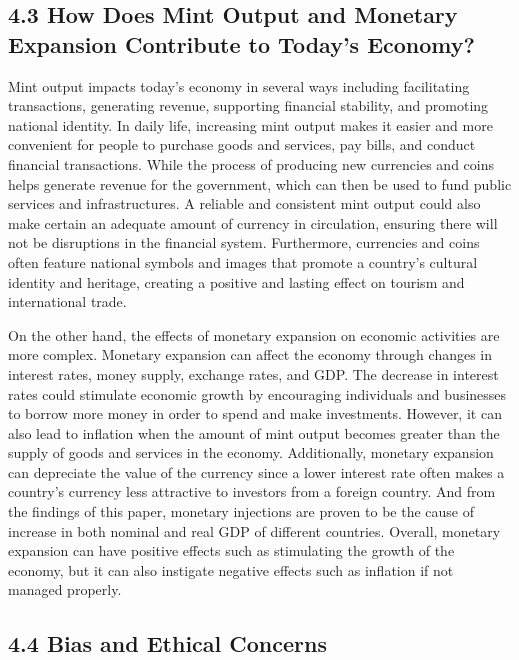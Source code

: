 \documentclass[
  letterpaper,
  DIV=11,
  numbers=noendperiod]{scrartcl}
\begin{document}
\hypertarget{how-does-mint-output-and-monetary-expansion-contribute-to-todays-economy}{%
\subsection{4.3 How Does Mint Output and Monetary Expansion Contribute
to Today's
Economy?}\label{how-does-mint-output-and-monetary-expansion-contribute-to-todays-economy}}

Mint output impacts today's economy in several ways including
facilitating transactions, generating revenue, supporting financial
stability, and promoting national identity. In daily life, increasing
mint output makes it easier and more convenient for people to purchase
goods and services, pay bills, and conduct financial transactions. While
the process of producing new currencies and coins helps generate revenue
for the government, which can then be used to fund public services and
infrastructures. A reliable and consistent mint output could also make
certain an adequate amount of currency in circulation, ensuring there
will not be disruptions in the financial system. Furthermore, currencies
and coins often feature national symbols and images that promote a
country's cultural identity and heritage, creating a positive and
lasting effect on tourism and international trade.

On the other hand, the effects of monetary expansion on economic
activities are more complex. Monetary expansion can affect the economy
through changes in interest rates, money supply, exchange rates, and
GDP. The decrease in interest rates could stimulate economic growth by
encouraging individuals and businesses to borrow more money in order to
spend and make investments. However, it can also lead to inflation when
the amount of mint output becomes greater than the supply of goods and
services in the economy. Additionally, monetary expansion can depreciate
the value of the currency since a lower interest rate often makes a
country's currency less attractive to investors from a foreign country.
And from the findings of this paper, monetary injections are proven to
be the cause of increase in both nominal and real GDP of different
countries. Overall, monetary expansion can have positive effects such as
stimulating the growth of the economy, but it can also instigate
negative effects such as inflation if not managed properly.

\hypertarget{bias-and-ethical-concerns}{%
\subsection{4.4 Bias and Ethical
Concerns}\label{bias-and-ethical-concerns}}
\end{document}
